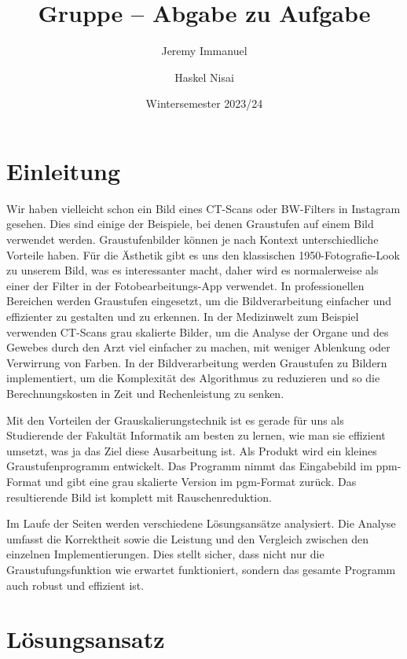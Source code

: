 \documentclass[course=asp]{aspdoc}
\author{Jeremy Immanuel \and Haskel Nisai}
\date{Wintersemester 2023/24} %
\title{Gruppe \theGroup{} -- Abgabe zu Aufgabe \theNumber}
\begin{document}
\maketitle

\section{Einleitung}
Wir haben vielleicht schon ein Bild eines CT-Scans oder BW-Filters in Instagram gesehen. Dies sind einige der Beispiele, bei denen Graustufen auf einem Bild verwendet werden. Graustufenbilder können je nach Kontext unterschiedliche Vorteile haben. Für die Ästhetik gibt es uns den klassischen 1950-Fotografie-Look zu unserem Bild, was es interessanter macht, daher wird es normalerweise als einer der Filter in der Fotobearbeitungs-App verwendet. In professionellen Bereichen werden Graustufen eingesetzt, um die Bildverarbeitung einfacher und effizienter zu gestalten und zu erkennen. In der Medizinwelt zum Beispiel verwenden CT-Scans grau skalierte Bilder, um die Analyse der Organe und des Gewebes durch den Arzt viel einfacher zu machen, mit weniger Ablenkung oder Verwirrung von Farben. In der Bildverarbeitung werden Graustufen zu Bildern implementiert, um die Komplexität des Algorithmus zu reduzieren und so die Berechnungskosten in Zeit und Rechenleistung zu senken.

Mit den Vorteilen der Grauskalierungstechnik ist es gerade für uns als Studierende der Fakultät Informatik am besten zu lernen, wie man sie effizient umsetzt, was ja das Ziel diese Ausarbeitung ist. Als Produkt wird ein kleines Graustufenprogramm entwickelt. Das Programm nimmt das Eingabebild im ppm-Format und gibt eine grau skalierte Version im pgm-Format zurück. Das resultierende Bild ist komplett mit Rauschenreduktion.

Im Laufe der Seiten werden verschiedene Lösungsansätze analysiert. Die Analyse umfasst die Korrektheit sowie die Leistung und den Vergleich zwischen den einzelnen Implementierungen. Dies stellt sicher, dass nicht nur die Graustufungsfunktion wie erwartet funktioniert, sondern das gesamte Programm auch robust und effizient ist.


\section{Lösungsansatz}
\end{document}
